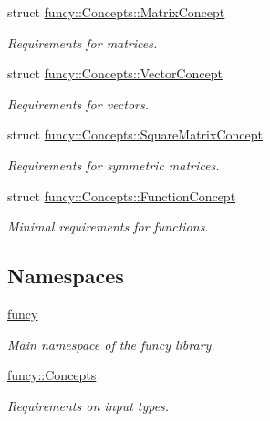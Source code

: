 \begin{DoxyCompactItemize}
struct \hyperlink{structfuncy_1_1Concepts_1_1MatrixConcept}{funcy\-::\-Concepts\-::\-Matrix\-Concept}
\begin{DoxyCompactList}\small\item\em Requirements for matrices. \end{DoxyCompactList}\item 
struct \hyperlink{structfuncy_1_1Concepts_1_1VectorConcept}{funcy\-::\-Concepts\-::\-Vector\-Concept}
\begin{DoxyCompactList}\small\item\em Requirements for vectors. \end{DoxyCompactList}\item 
struct \hyperlink{structfuncy_1_1Concepts_1_1SquareMatrixConcept}{funcy\-::\-Concepts\-::\-Square\-Matrix\-Concept}
\begin{DoxyCompactList}\small\item\em Requirements for symmetric matrices. \end{DoxyCompactList}\item 
struct \hyperlink{structfuncy_1_1Concepts_1_1FunctionConcept}{funcy\-::\-Concepts\-::\-Function\-Concept}
\begin{DoxyCompactList}\small\item\em Minimal requirements for functions. \end{DoxyCompactList}\end{DoxyCompactItemize}
\subsection*{Namespaces}
\begin{DoxyCompactItemize}
\item 
\hyperlink{namespacefuncy}{funcy}
\begin{DoxyCompactList}\small\item\em Main namespace of the funcy library. \end{DoxyCompactList}\item 
\hyperlink{namespacefuncy_1_1Concepts}{funcy\-::\-Concepts}
\begin{DoxyCompactList}\small\item\em Requirements on input types. \end{DoxyCompactList}\end{DoxyCompactItemize}
